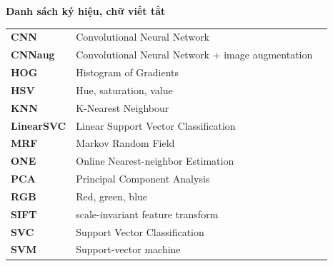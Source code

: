\documentclass[12pt]{report}
\begin{document}
		\newpage
		\begin{flushleft}
			\bfseries{\Huge{Danh sách ký hiệu, chữ viết tắt}}
		\end{flushleft}
		\begin{table}[h]
			\centering
			\begin{tabular}{lll}
				\textbf{CNN}       & Convolutional Neural Network                      \\[0.3cm]
				\textbf{CNNaug}    & Convolutional Neural Network + image augmentation \\[0.3cm]
				\textbf{HOG}       & Histogram of Gradients                            \\[0.3cm]
				\textbf{HSV}       & Hue, saturation, value                            \\[0.3cm]
				\textbf{KNN}       & K-Nearest Neighbour                               \\[0.3cm]
				\textbf{LinearSVC} & Linear Support Vector Classification              \\[0.3cm]
				\textbf{MRF}       & Markov Random Field                               \\[0.3cm]
				\textbf{ONE}       & Online Nearest-neighbor Estimation                \\[0.3cm]
				\textbf{PCA}       & Principal Component Analysis                      \\[0.3cm]
				\textbf{RGB}       & Red, green, blue                                  \\[0.3cm]
				\textbf{SIFT}      & scale-invariant feature transform                 \\[0.3cm]
				\textbf{SVC}       & Support Vector Classification                     \\[0.3cm]
				\textbf{SVM}       & Support-vector machine                            \\[0.3cm]
				
				
				
				
				
																																																																																																																																																						
			\end{tabular}
		\end{table}
																																																																										
		\newpage
		\listoffigures
																																																																										
\end{document}
